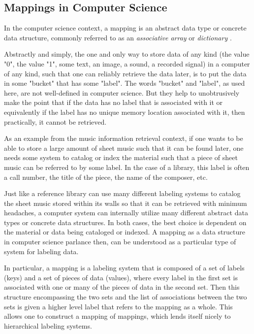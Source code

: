 \subsection{Mappings in Computer Science}
\label{sec:Mappings in Computer Science}

In the computer science context, a mapping is an abstract data type or concrete data structure, commonly referred to as an \emph{associative array} or \emph{dictionary} \cite{assocarray2008}.  

Abstractly and simply, the one and only way to store data of any kind (the value "0", the value "1", some text, an image, a sound, a recorded signal) in a computer of any kind, such that one can reliably retrieve the data later, is to put the data in some "bucket" that has some "label". The words "bucket" and "label", as used here, are not well-defined in computer science. But they help to unobtrusively make the point that if the data has no label that is associated with it or equivalently if the label has no unique memory location associated with it, then practically, it cannot be retrieved. 

As an example from the music information retrieval context, if one wants to be able to store a large amount of sheet music such that it can be found later, one needs some system to catalog or index the material such that a piece of sheet music can be referred to by some label. In the case of a library, this label is often a call number, the title of the piece, the name of the composer, etc.

Just like a reference library can use many different labeling systems to catalog the sheet music stored within its walls so that it can be retrieved with minimum headaches, a computer system can internally utilize many different abstract data types or concrete data structures. In both cases, the best choice is dependent on the material or data being cataloged or indexed. A mapping as a data structure in computer science parlance then, can be understood as a particular type of system for labeling data.

In particular, a mapping is a labeling system that is composed of a set of labels (keys) and a set of pieces of data (values), where every label in the first set is associated with one or many of the pieces of data in the second set. Then this structure encompassing the two sets and the list of associations between the two sets is given a higher level label that refers to the mapping as a whole. This allows one to construct a mapping of mappings, which lends itself nicely to hierarchical labeling systems.

